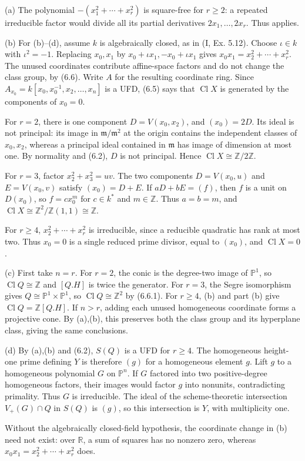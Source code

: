 (a) The polynomial $-(x_1^2+\cdots+x_r^2)$ is square-free for $r\geq2$: a repeated irreducible factor would divide all its partial derivatives $2x_1,\ldots,2x_r$. Thus  applies.

(b) For (b)--(d), assume $k$ is algebraically closed, as in (I, Ex. 5.12). Choose $\iota\in k$ with $\iota^2=-1$. Replacing $x_0,x_1$ by $x_0+\iota x_1,-x_0+\iota x_1$ gives $x_0x_1=x_2^2+\cdots+x_r^2$. The unused coordinates contribute affine-space factors and do not change the class group, by (6.6). Write $A$ for the resulting coordinate ring. Since $A_{x_0}=k[x_0,x_0^{-1},x_2,\ldots,x_n]$ is a UFD, (6.5) says that $\operatorname{Cl}X$ is generated by the components of $x_0=0$.

For $r=2$, there is one component $D=V(x_0,x_2)$, and $(x_0)=2D$. Its ideal is not principal: its image in $\mathfrak m/\mathfrak m^2$ at the origin contains the independent classes of $x_0,x_2$, whereas a principal ideal contained in $\mathfrak m$ has image of dimension at most one. By normality and (6.2), $D$ is not principal. Hence $\operatorname{Cl}X\cong\mathbb Z/2\mathbb Z$.

For $r=3$, factor $x_2^2+x_3^2=uv$. The two components $D=V(x_0,u)$ and $E=V(x_0,v)$ satisfy $(x_0)=D+E$. If $aD+bE=(f)$, then $f$ is a unit on $D(x_0)$, so $f=cx_0^m$ for $c\in k^*$ and $m\in\mathbb Z$. Thus $a=b=m$, and $\operatorname{Cl}X\cong\mathbb Z^2/\mathbb Z(1,1)\cong\mathbb Z$.

For $r\geq4$, $x_2^2+\cdots+x_r^2$ is irreducible, since a reducible quadratic has rank at most two. Thus $x_0=0$ is a single reduced prime divisor, equal to $(x_0)$, and $\operatorname{Cl}X=0$.

(c) First take $n=r$. For $r=2$, the conic is the degree-two image of $\mathbb P^1$, so $\operatorname{Cl}Q\cong\mathbb Z$ and $[Q.H]$ is twice the generator. For $r=3$, the Segre isomorphism gives $Q\cong\mathbb P^1\times\mathbb P^1$, so $\operatorname{Cl}Q\cong\mathbb Z^2$ by (6.6.1). For $r\geq4$, (b) and part (b) give $\operatorname{Cl}Q=\mathbb Z[Q.H]$. If $n>r$, adding each unused homogeneous coordinate forms a projective cone. By (a),(b), this preserves both the class group and its hyperplane class, giving the same conclusions.

(d) By (a),(b) and (6.2), $S(Q)$ is a UFD for $r\geq4$. The homogeneous height-one prime defining $Y$ is therefore $(g)$ for a homogeneous element $g$. Lift $g$ to a homogeneous polynomial $G$ on $\mathbb P^n$. If $G$ factored into two positive-degree homogeneous factors, their images would factor $g$ into nonunits, contradicting primality. Thus $G$ is irreducible. The ideal of the scheme-theoretic intersection $V_+(G)\cap Q$ in $S(Q)$ is $(g)$, so this intersection is $Y$, with multiplicity one.

Without the algebraically closed-field hypothesis, the coordinate change in (b) need not exist: over $\mathbb R$, a sum of squares has no nonzero zero, whereas $x_0x_1=x_2^2+\cdots+x_r^2$ does.
